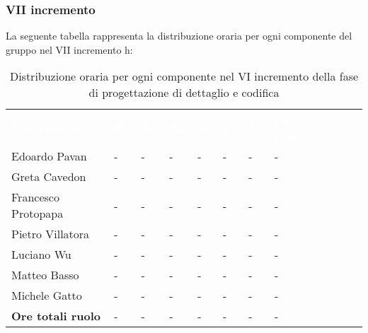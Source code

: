 \subsubsection{VII incremento}
La seguente tabella rappresenta la distribuzione oraria per ogni componente del gruppo nel VII incremento h:
\begin{table}[!htbp]
\begin{center}
\renewcommand{\arraystretch}{1.25}
\begin{tabular}{ m{}<{\centering}  m{}<{\centering} m{}<{\centering} m{}<{\centering}  m{}<{\centering}  m{}<{\centering}  m{}<{\centering}  m{}<{\centering}   }
	\rowcolor{darkblue}
	\textcolor{white}{\textbf{Componente}} &\textcolor{white}{\textbf{Re}}&\textcolor{white}{\textbf{Ad}}&\textcolor{white}{\textbf{An}}&\textcolor{white}{\textbf{Pt}}&\textcolor{white}{\textbf{Pr}}&\textcolor{white}{\textbf{Ve}}&\textcolor{white}{\textbf{Ore complessive}}\\ 

	Edoardo Pavan & - & - & - & - & - & - & -\\	

	\rowcolor{gray!10} Greta Cavedon & - & - & - & - & - & - & -\\
	
	Francesco Protopapa & - & - & - & - & - & - & -\\
	
	\rowcolor{gray!10} Pietro Villatora & - & - & - & - & - & - & -\\
	
	Luciano Wu & - & - & - & - & - & - & -\\
	
	\rowcolor{gray!10} Matteo Basso & - & - & - & - & - & - & -\\
	
	Michele Gatto & - & - & - & - & - & - & -\\
	
	\rowcolor{gray!10} \textbf{Ore totali ruolo} & - & - & - & - & - & - & -\\

\end{tabular}
\caption{Distribuzione oraria per ogni componente nel VI incremento della fase di progettazione di dettaglio e codifica}
\end{center}
\end{table}

